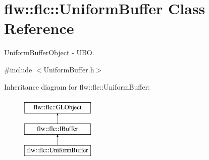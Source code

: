 \hypertarget{classflw_1_1flc_1_1UniformBuffer}{}\section{flw\+:\+:flc\+:\+:Uniform\+Buffer Class Reference}
\label{classflw_1_1flc_1_1UniformBuffer}


Uniform\+Buffer\+Object -\/ U\+BO.  




{\ttfamily \#include $<$Uniform\+Buffer.\+h$>$}

Inheritance diagram for flw\+:\+:flc\+:\+:Uniform\+Buffer\+:\begin{figure}[H]
\begin{center}
\leavevmode
\includegraphics[height=3.000000cm]{classflw_1_1flc_1_1UniformBuffer}
\end{center}
\end{figure}

